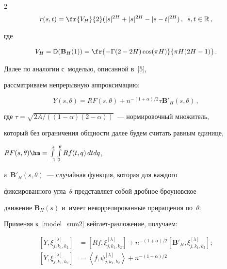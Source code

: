 \begin{multicols}{2}
\begin{equation*}
r(s,t) = \fr{V_H}{2}(|s|^{2H} + |s|^{2H} - |s-t|^{2H})\,, \enskip s,t \in \mathbb{R}\,,


\end{equation*}


где


$$


V_H = \Variance (\mathbf{B}_H(1)) =


\fr{-\Gamma(2-2H)\cos(\pi H)}{\pi H(2H-1)}\,.


$$





Далее по аналогии с~моделью, описанной в~[5],


рассматриваем непрерывную аппроксимацию:


\begin{equation}


Y(s,\theta) = R F(s,\theta) + n^{-(1+\alpha)/2} \tau \mathbf{B'}_H(s,\theta)\,,


\label{model_sum2}


\end{equation}


где $\tau = \sqrt{{2A}/({(1-\alpha)(2-\alpha)})}$~--- нормировочный множитель,


который без ограничения общности далее будем считать равным единице,


$R F(s,\theta)\hm=\int\limits_{-1}^{s}\int\limits_{0}^{\theta}Rf(t,q)\,dtdq$,


а~$\mathbf{B'}_H(s,\theta)$~--- случайная функция, которая для каждого


фиксированного угла~$\theta$ представляет собой дробное броуновское


движение $\mathbf{B}_H(s)$ и~имеет некоррелированные приращения по~$\theta$.





Применяя к~\eqref{model_sum2} вейглет-раз\-ло\-же\-ние, получаем:


\begin{align*}


\left[Y, \xi_{j,k_1,k_2}^{[\lambda]}\right] &\!\!= \!


\left[R f, \xi_{j,k_1,k_2}^{[\lambda]}\right]\! \!+\! n^{-(1+\alpha)/2}


\left[ \mathbf{B'}_H, \xi_{j,k_1,k_2}^{[\lambda]}\right]\!;\\


\left[Y, \xi_{j,k_1,k_2}^{[\lambda]}\right] &\!\!= \!


\left\langle f, \psi_{j,k_1,k_2}^{[\lambda]}\right\rangle \!+\! n^{-(1+\alpha)/2}



\end{align*}
\end{multicols}
